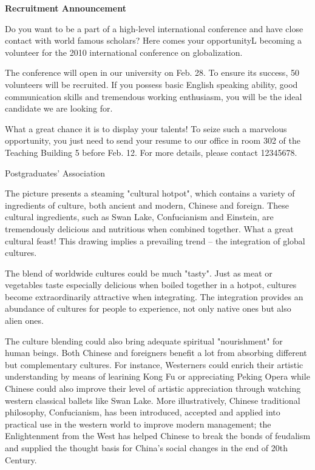\begin{center}\textbf{Recruitment Announcement}\end{center}

Do you want to be a part of a high-level international conference and have close contact with world famous scholars? Here comes your opportunityL becoming a volunteer for the 2010 international conference on globalization.

The conference will open in our university on Feb. 28. To ensure its success, 50 volunteers will be recruited. If you possess basic English speaking ability, good communication skills and tremendous working enthusiasm, you will be the ideal candidate we are looking for.

What a great chance it is to display your talents! To seize such a marvelous opportunity, you just need to send your resume to our office in room 302 of the Teaching Building 5 before Feb. 12. For more details, please contact 12345678.

\begin{flushright}Postgraduates' Association\end{flushright}

The picture presents a steaming "cultural hotpot", which contains a variety of ingredients of culture, both ancient and modern, Chinese and foreign. These cultural ingredients, such as Swan Lake, Confucianism and Einstein, are tremendously delicious and nutritious when combined together. What a great cultural feast! This drawing implies a prevailing trend -- the integration of global cultures.

The blend of worldwide cultures could be much "tasty". Just as meat or vegetables taste especially delicious when boiled together in a hotpot, cultures become extraordinarily attractive when integrating. The integration provides an abundance of cultures for people to experience, not only native ones but also alien ones.

The culture blending could also bring adequate spiritual "nourishment" for human beings. Both Chinese and foreigners benefit a lot from absorbing different but complementary cultures. For instance, Westerners could enrich their artistic understanding by means of learining Kong Fu or appreciating Peking Opera while Chinese could also improve their level of artistic appreciation through watching western classical ballets like Swan Lake. More illustratively, Chinese traditional philosophy, Confucianism, has been introduced, accepted and applied into practical use in the western world to improve modern management; the Enlightenment from the West has helped Chinese to break the bonds of feudalism and supplied the thought basis for China's social changes in the end of 20th Century.
